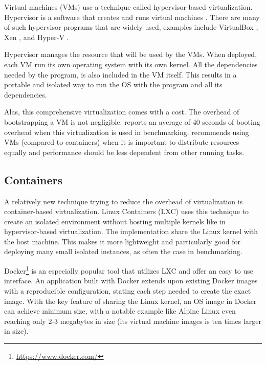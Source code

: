 Virtual machines (VMs) use a technique called hypervisor-based virtualization.
Hypervisor is a software that creates and runs virtual machines \citep{scheepersVirtualizationContainerizationApplication2014}.
There are many of such hypervisor programs that are widely used, examples include VirtualBox \citep{OracleVMVirtualBox}, Xen \citep{XenProject}, and Hyper-V \citep{scooleyIntroductionHyperVWindows}.

Hypervisor manages the resource that will be used by the VMs.
When deployed, each VM run its own operating system with its own kernel.
All the dependencies needed by the program, is also included in the VM itself.
This results in a portable and isolated way to run the OS with the program and all its dependencies.

Alas, this comprehensive virtualization comes with a cost.
The overhead of bootstrapping a VM is not negligible.
\citet{kordonBenchKitToolMassive2014} reports an average of 40 seconds of booting overhead when this virtualization is used in benchmarking.
\citet{scheepersVirtualizationContainerizationApplication2014} recommends using VMs (compared to containers) when it is important to distribute resources equally and performance should be less dependent from other running tasks.

\subsection{Containers}

A relatively new technique trying to reduce the overhead of virtualization is container-based virtualization.
Linux Containers (LXC) \citep{LinuxContainers} uses this technique to create an isolated environment without hosting multiple kernels like in hypervisor-based virtualization.
The implementation share the Linux kernel with the host machine.
This makes it more lightweight and particularly good for deploying many small isolated instances, as often the case in benchmarking.

Docker\footnote{\href{https://www.docker.com/}{https://www.docker.com/}} is an especially popular tool that utilizes LXC and offer an easy to use interface.
An application built with Docker extends upon existing Docker images with a reproducible  configuration, stating each step needed to create the exact image.
With the key feature of sharing the Linux kernel, an OS image in Docker can achieve minimum size, with a notable example like Alpine Linux even reaching only 2-3 megabytes in size (its virtual machine images is ten times larger in size).


